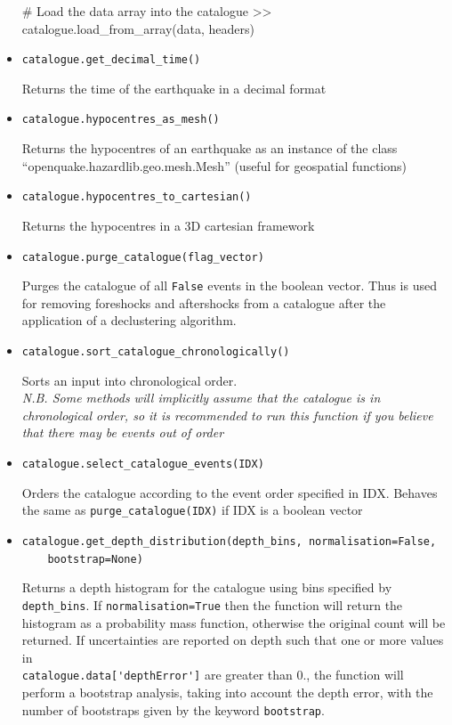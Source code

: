 \begin{itemize}
\begin{python}[frame=single]
# Load the data array into the catalogue
>> catalogue.load_from_array(data, headers)
\end{python}
 

\item \verb=catalogue.get_decimal_time()= 

Returns the time of the earthquake in a decimal format

\item \verb=catalogue.hypocentres_as_mesh()=

Returns the hypocentres of an earthquake as an instance of the class \\ ``openquake.hazardlib.geo.mesh.Mesh'' (useful for geospatial functions)

\item \verb=catalogue.hypocentres_to_cartesian()=

Returns the hypocentres in a 3D cartesian framework

\item \verb=catalogue.purge_catalogue(flag_vector)=

Purges the catalogue of all \verb=False= events in the boolean vector. Thus is used for removing foreshocks and aftershocks from a catalogue after the application of a declustering algorithm.

\item \verb=catalogue.sort_catalogue_chronologically()=

Sorts an input into chronological order. \\
\emph{N.B. Some methods will implicitly assume that the catalogue is in chronological order, so it is recommended to run this function if you believe that there may be events out of order}

\item \verb=catalogue.select_catalogue_events(IDX)=

Orders the catalogue according to the event order specified in IDX. Behaves the same as \verb=purge_catalogue(IDX)= if IDX is a boolean vector

\item \verb;catalogue.get_depth_distribution(depth_bins, normalisation=False,;\\
\verb;    bootstrap=None);

Returns a depth histogram for the catalogue using bins specified by \verb=depth_bins=. If \verb;normalisation=True; then the function will return the histogram as a probability mass function, otherwise the original count will be returned. If uncertainties are reported on depth such that one or more values in \\ \verb=catalogue.data['depthError']= are greater than 0., the function will perform a bootstrap analysis, taking into account the depth error, with the number of bootstraps given by the keyword \verb=bootstrap=. 


\end{itemize}
